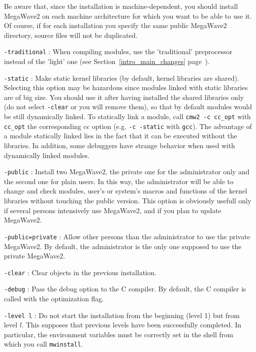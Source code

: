 Be aware that, since the installation is machine-dependent, you should install MegaWave2 on each
machine architecture for which you want to be able to use it. Of course, if for each installation
you specify the same public MegaWave2 directory, source files will not be duplicated.
\Next

\Options

\verb+-traditional+ : When compiling modules, use the 'traditional' preprocessor instead of the 'light' one
(see Section~\ref{intro_main_changes} page~\pageref{intro_main_changes}).

\verb+-static+ :  Make static kernel libraries (by default, kernel libraries are shared). Selecting
this option may be hazardous since modules linked with static libraries are of big size. 
You should use it after having installed the shared libraries only (do not select \verb+-clear+ or
you will remove them), so that by default modules would be still dynamically linked. 
To statically link a module, call \verb+cmw2 -c cc_opt+ with \verb+cc_opt+ the corresponding cc option
(e.g. \verb+-c -static+ with \verb+gcc+).
The advantage of a module statically linked lies in the fact that it can be executed without
the libraries. In addition, some debuggers have strange behavior when used with dynamically linked
modules. 
 
\verb+-public+ : Install two MegaWave2, the private one for the administrator only and the second
one for plain users. In this way, the administrator will be able to change and check modules, 
user's or system's macros and functions of the kernel libraries without touching the public version.
This option is obviously usefull only if several persons intensively use MegaWave2, and if you
plan to update MegaWave2.

\verb+-public=private+ : Allow other persons than the administrator to use the private MegaWave2.
By default, the administrator is the only one supposed to use the private MegaWave2.

\verb+-clear+ : Clear objects in the previous installation.

\verb+-debug+ : Pass the debug option to the C compiler. By default, the C compiler is called with
the optimization flag.

\verb+-level l+ : Do not start the installation from the beginning (level 1) but from level $l$.
This supposes that previous levels have been successfully completed. 
In particular, the environment variables must be correctly set in the shell from which you
call \verb+mwinstall+.

